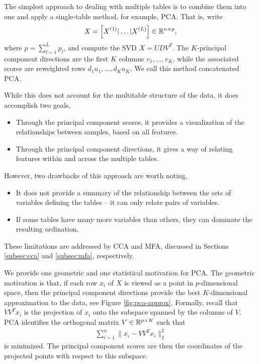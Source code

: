\documentclass[14pt]{extarticle}
\begin{document}
The simplest approach to dealing with multiple tables is to combine them into
one and apply a single-table method, for example, PCA. That is, write
\begin{align*}
X = \left[X^{(1)} \vert \dots \vert X^{(L)}\right] \in \mathbb{R}^{n \times p},
\end{align*}
where $p = \sum_{l = 1}^{L}p_{l}$, and compute the SVD $X = UDV^{T}$. The
$K$-principal component directions are the first $K$ columns $v_{1}, \dots,
v_{K}$, while the associated scores are reweighted rows $d_{1}u_{1}, \dots,
d_{K}u_{K}$. We call this method concatenated PCA.

While this does not account for the multitable structure of the data, it does
accomplish two goals,
\begin{itemize}
\item Through the principal component scores, it provides a visualization of the
  relationships between samples, based on all features.
\item Through the principal component directions, it gives a way of relating
  features within and across the multiple tables.
\end{itemize}

However, two drawbacks of this approach are worth noting,
\begin{itemize}
  \item It does not provide a summary of the relationship between the sets of
    variables defining the tables -- it can only relate pairs of
    variables. \label{bullet:pca_drawback_one}
  \item If some tables have many more variables than others, they can dominate
    the resulting ordination. \label{bullet:pca_drawback_two}
\end{itemize}

These limitations are addressed by CCA and MFA, discussed in Sections
\ref{subsec:cca} and \ref{subsec:mfa}, respectively.

We provide one geometric and one statistical motivation for PCA. The geometric
motivation is that, if each row $x_{i}$ of $X$ is viewed as a point in
$p$-dimensional space, then the principal component directions provide the best
$K$-dimensional approximation to the data, see Figure \ref{fig:pca-approx}.
Formally, recall that $VV^{T}x_{i}$ is the projection of $x_{i}$ onto the
subspace spanned by the columns of $V$. PCA identifies the orthogonal matrix $V
\in \mathbb{R}^{p \times K}$ such that
\begin{align*}
\sum_{i = 1}^{n}\|x_{i} - VV^{T} x_{i}\|_{2}^{2}
\end{align*}
is minimized. The principal component scores are then the coordinates of the
projected points with respect to this subspace.
\end{document}

